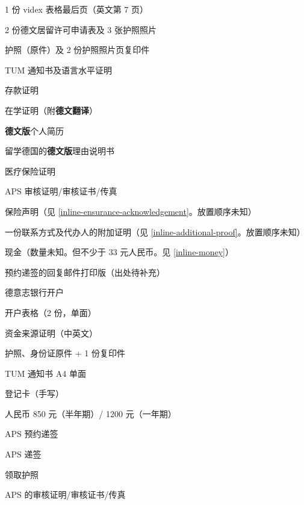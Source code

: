 \documentclass{article}
\begin{document}
\begin{Form}
\begin{enumerate}[label = {\CheckBox[width=.1in,height=.1in,name=process\theenumi]{}}]
\begin{enumerate}[label = {\CheckBox[width=.1in,height=.1in,name=subprocess\theenumii]{}}]
\begin{multicols}{2}
\begin{enumerate}[label = {\CheckBox[width=.1in,height=.1in,name=subsubprocess\theenumiii]{}} \arabic*.]
      \item 1 份 videx 表格最后页（英文第 7 页）
      \item 2 份德文居留许可申请表及 3 张护照照片
      \item 护照（原件）及 2 份护照照片页复印件
      \item TUM 通知书及语言水平证明
      \item 存款证明
      \item 在学证明（附\textbf{德文翻译}）
      \item \textbf{德文版}个人简历
      \item 留学德国的\textbf{德文版}理由说明书
      \item 医疗保险证明
      \item APS 审核证明/审核证书/传真
      \item 保险声明（见 \ref{inline-ensurance-acknowledgement}。放置顺序未知）
      \item 一份联系方式及代办人的附加证明（见 \ref{inline-additional-proof}。放置顺序未知）
      \item 现金（数量未知。但不少于 33 元人民币。见 \ref{inline-money}）
      \item 预约递签的回复邮件打印版（出处待补充）
      \end{enumerate}
      \end{multicols}
    \item 德意志银行开户
      \begin{multicols}{2}
      \begin{enumerate}[label = {\CheckBox[width=.1in,height=.1in,name=subsubprocess\theenumiii]{}} \arabic*.]
        \item 开户表格（2 份，单面）
        \item 资金来源证明（中英文）
        \item 护照、身份证原件 + 1 份复印件
        \item TUM 通知书 A4 单面
        \item 登记卡（手写）
        \item 人民币 850 元（半年期）/ 1200 元（一年期）%
      \end{enumerate}
      \end{multicols}
    \item APS 预约递签
    \item APS 递签
    \item 领取护照
    \item APS 的审核证明/审核证书/传真
  \end{enumerate}

\end{enumerate}
\end{Form}
\end{document}
